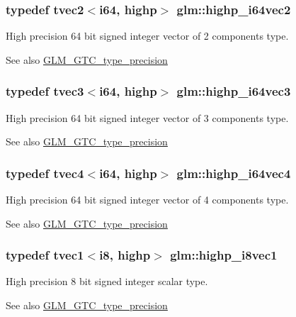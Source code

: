 \subsubsection[{highp\+\_\+i64vec2}]{\setlength{\rightskip}{0pt plus 5cm}typedef tvec2$<${\bf i64}, highp$>$ {\bf glm\+::highp\+\_\+i64vec2}}\label{namespaceglm_a8b9347c378dc3f977fdd0c3ea995b7ad}
High precision 64 bit signed integer vector of 2 components type. \begin{DoxySeeAlso}{See also}
\hyperlink{group__gtc__type__precision}{G\+L\+M\+\_\+\+G\+T\+C\+\_\+type\+\_\+precision} 
\end{DoxySeeAlso}
\hypertarget{namespaceglm_a9e2742492829f9a189289ffd79de1183}{}
\subsubsection[{highp\+\_\+i64vec3}]{\setlength{\rightskip}{0pt plus 5cm}typedef tvec3$<${\bf i64}, highp$>$ {\bf glm\+::highp\+\_\+i64vec3}}\label{namespaceglm_a9e2742492829f9a189289ffd79de1183}
High precision 64 bit signed integer vector of 3 components type. \begin{DoxySeeAlso}{See also}
\hyperlink{group__gtc__type__precision}{G\+L\+M\+\_\+\+G\+T\+C\+\_\+type\+\_\+precision} 
\end{DoxySeeAlso}
\hypertarget{namespaceglm_af27ae242d933e3e3f0fd99a73ae09bdb}{}
\subsubsection[{highp\+\_\+i64vec4}]{\setlength{\rightskip}{0pt plus 5cm}typedef tvec4$<${\bf i64}, highp$>$ {\bf glm\+::highp\+\_\+i64vec4}}\label{namespaceglm_af27ae242d933e3e3f0fd99a73ae09bdb}
High precision 64 bit signed integer vector of 4 components type. \begin{DoxySeeAlso}{See also}
\hyperlink{group__gtc__type__precision}{G\+L\+M\+\_\+\+G\+T\+C\+\_\+type\+\_\+precision} 
\end{DoxySeeAlso}
\hypertarget{namespaceglm_a854b15e7f4a403edea8cc8ec7e909c93}{}
\subsubsection[{highp\+\_\+i8vec1}]{\setlength{\rightskip}{0pt plus 5cm}typedef tvec1$<${\bf i8}, highp$>$ {\bf glm\+::highp\+\_\+i8vec1}}\label{namespaceglm_a854b15e7f4a403edea8cc8ec7e909c93}
High precision 8 bit signed integer scalar type. \begin{DoxySeeAlso}{See also}
\hyperlink{group__gtc__type__precision}{G\+L\+M\+\_\+\+G\+T\+C\+\_\+type\+\_\+precision} 
\end{DoxySeeAlso}
\hypertarget{namespaceglm_a4f10fdcaf6ec5d8229800fb4f089437a}{}
